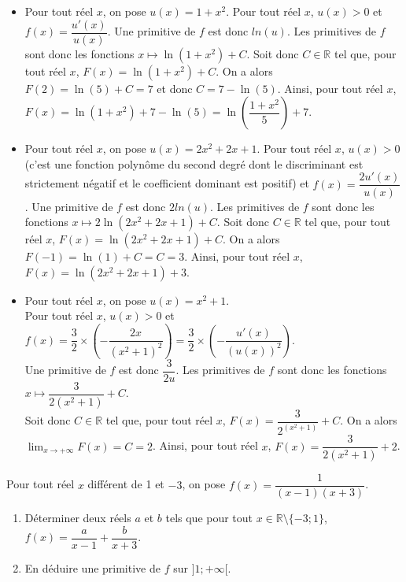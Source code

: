 \documentclass[11pt,fleqn, openany]{book} %
\begin{document}
\begin{solution}
\begin{itemize}
\item Pour tout réel \(x\), on pose \(u(x)=1+x^2\). Pour tout réel \(x\), \(u(x)>0\) et \(f(x)=\dfrac{u'(x)}{u(x)}\). Une primitive de \(f\) est donc \(ln(u)\). Les primitives de \(f\) sont donc les fonctions \(x\mapsto \ln(1+x^2)+C\). Soit donc \(C\in\mathbb{R}\) tel que, pour tout réel \(x\), \(F(x)=\ln(1+x^2)+C\). On a alors \(F(2)=\ln(5)+C=7\) et donc \(C=7-\ln(5)\). Ainsi, pour tout réel \(x\), \(F(x)=\ln(1+x^2)+7-\ln(5)=\ln\left(\dfrac{1+x^2}{5}\right)+7\).
\vskip5pt
\item Pour tout réel \(x\), on pose \(u(x)=2x^2+2x+1\). Pour tout réel \(x\), \(u(x)>0\) (c'est une fonction polynôme du second degré dont le discriminant est strictement négatif et le coefficient dominant est positif) et \(f(x)=\dfrac{2u'(x)}{u(x)}\). Une primitive de \(f\) est donc \(2ln(u)\). Les primitives de \(f\) sont donc les fonctions \(x\mapsto 2\ln(2x^2+2x+1)+C\). Soit donc \(C\in\mathbb{R}\) tel que, pour tout réel \(x\), \(F(x)=\ln(2x^2+2x+1)+C\). On a alors \(F(-1)=\ln(1)+C=C=3\). Ainsi, pour tout réel \(x\), \(F(x)=\ln(2x^2+2x+1)+3\).
\vskip5pt
\item Pour tout réel \(x\), on pose \(u(x)=x^2+1\). \\ Pour tout réel \(x\), \(u(x)>0\) et \(f(x)=\dfrac{3}{2} \times \left(-\dfrac{2x}{(x^2+1)^2}\right)=\dfrac{3}{2}\times \left(-\dfrac{u'(x)}{(u(x))^2}\right)\). \\Une primitive de \(f\) est donc \(\dfrac{3}{2u}\). Les primitives de \(f\) sont donc les fonctions \(x\mapsto \dfrac{3}{2(x^2+1)}+C\). \\Soit donc \(C\in\mathbb{R}\) tel que, pour tout réel \(x\), \(F(x)=\dfrac{3}{2^(x^2+1)}+C\). On a alors \(\displaystyle\lim_{x \to +\infty}F(x)=C=2\). Ainsi, pour tout réel \(x\), \(F(x)=\dfrac{3}{2(x^2+1)}+2\).\end{itemize}\end{solution}




\begin{exercise}Pour tout réel $x$ différent de 1 et $-3$, on pose $f(x)=\dfrac{1}{(x-1)(x+3)}$.
\begin{enumerate}
\item Déterminer deux réels $a$ et $b$ tels que pour tout $x \in \mathbb{R}\setminus \{ -3;1\}$, $f(x)=\dfrac{a}{x-1}+\dfrac{b}{x+3}$.
\item En déduire une primitive de $f$ sur $]1;+\infty[$.
\end{enumerate}

\end{exercise}
\end{document}
